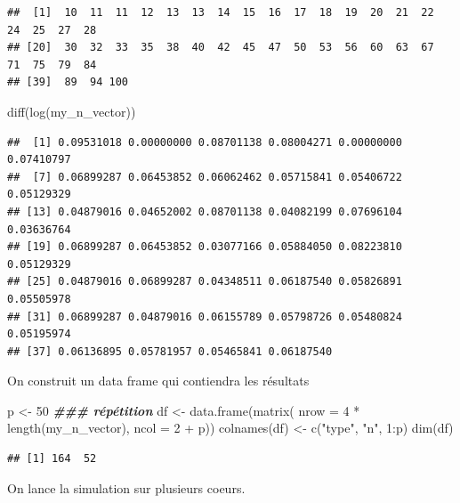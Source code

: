 \documentclass[
]{article}
\newenvironment{Shaded}{\begin{snugshade}}{\end{snugshade}}
\newcommand{\AttributeTok}[1]{\textcolor[rgb]{0.77,0.63,0.00}{#1}}
\newcommand{\DecValTok}[1]{\textcolor[rgb]{0.00,0.00,0.81}{#1}}
\newcommand{\DocumentationTok}[1]{\textcolor[rgb]{0.56,0.35,0.01}{\textbf{\textit{#1}}}}
\newcommand{\FunctionTok}[1]{\textcolor[rgb]{0.00,0.00,0.00}{#1}}
\newcommand{\NormalTok}[1]{#1}
\newcommand{\OtherTok}[1]{\textcolor[rgb]{0.56,0.35,0.01}{#1}}
\newcommand{\SpecialCharTok}[1]{\textcolor[rgb]{0.00,0.00,0.00}{#1}}
\newcommand{\StringTok}[1]{\textcolor[rgb]{0.31,0.60,0.02}{#1}}
\begin{document}
\begin{verbatim}
##  [1]  10  11  11  12  13  13  14  15  16  17  18  19  20  21  22  24  25  27  28
## [20]  30  32  33  35  38  40  42  45  47  50  53  56  60  63  67  71  75  79  84
## [39]  89  94 100
\end{verbatim}

\begin{Shaded}
\begin{Highlighting}[]
\FunctionTok{diff}\NormalTok{(}\FunctionTok{log}\NormalTok{(my\_n\_vector))}
\end{Highlighting}
\end{Shaded}

\begin{verbatim}
##  [1] 0.09531018 0.00000000 0.08701138 0.08004271 0.00000000 0.07410797
##  [7] 0.06899287 0.06453852 0.06062462 0.05715841 0.05406722 0.05129329
## [13] 0.04879016 0.04652002 0.08701138 0.04082199 0.07696104 0.03636764
## [19] 0.06899287 0.06453852 0.03077166 0.05884050 0.08223810 0.05129329
## [25] 0.04879016 0.06899287 0.04348511 0.06187540 0.05826891 0.05505978
## [31] 0.06899287 0.04879016 0.06155789 0.05798726 0.05480824 0.05195974
## [37] 0.06136895 0.05781957 0.05465841 0.06187540
\end{verbatim}

On construit un data frame qui contiendra les résultats

\begin{Shaded}
\begin{Highlighting}[]
\NormalTok{p }\OtherTok{\textless{}{-}} \DecValTok{50} \DocumentationTok{\#\#\# répétition}
\NormalTok{df }\OtherTok{\textless{}{-}} \FunctionTok{data.frame}\NormalTok{(}\FunctionTok{matrix}\NormalTok{( }\AttributeTok{nrow =} \DecValTok{4} \SpecialCharTok{*} \FunctionTok{length}\NormalTok{(my\_n\_vector), }\AttributeTok{ncol =} \DecValTok{2} \SpecialCharTok{+}\NormalTok{ p))}
\FunctionTok{colnames}\NormalTok{(df) }\OtherTok{\textless{}{-}} \FunctionTok{c}\NormalTok{(}\StringTok{"type"}\NormalTok{, }\StringTok{"n"}\NormalTok{, }\DecValTok{1}\SpecialCharTok{:}\NormalTok{p)}
\FunctionTok{dim}\NormalTok{(df)}
\end{Highlighting}
\end{Shaded}

\begin{verbatim}
## [1] 164  52
\end{verbatim}

On lance la simulation sur plusieurs coeurs.
\end{document}
